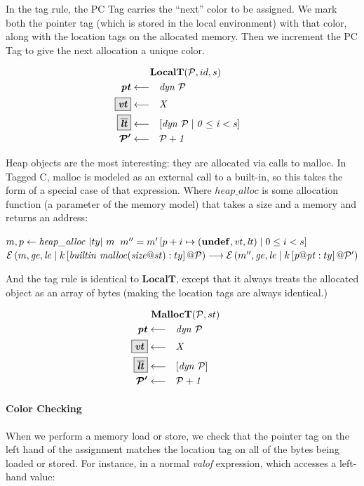 \documentclass{article}
\begin{document}
In the tag rule, the PC Tag carries the ``next'' color to be assigned. We mark both the pointer tag
(which is stored in the local environment) with that color, along with the location tags on the
allocated memory. Then we increment the PC Tag to give the next allocation a unique color.

\[\begin{aligned}
\truledef{\localt{\PCT}{id}{s}}
\settag{\pt}{dyn ~ \PCT}
\settagopt{\vt}{X}
\settagopt{\overline{\lt}}{\left[dyn ~ \PCT \mid 0 \leq i < s\right]}
\settag{\PCT'}{\PCT+1}
\end{aligned}\]
         
Heap objects are the most interesting: they are allocated via calls to malloc.
In Tagged C, malloc is modeled as an external call to a built-in, so this takes the form
of a special case of that expression. Where \(\mathit{heap\_alloc}\) is some allocation
function (a parameter of the memory model) that takes a size and a memory and returns an address:

              {\(\mem,p \leftarrow \mathit{heap\_alloc} ~ |ty| ~ \mem\)}
              {\(\mem'' = \mem'\left[p + i \mapsto (\vundef,\vt,\lt) \mid 0 \leq i < s\right]\)}
              {\(\defestate{\builtin{\mathit{malloc}}{\mathit{size}@st}}{ty}
                \longrightarrow
                \estate{\PCT'}{\mem''}{\genv}{\lenv}
                       {\val{p}{\pt}}{ty}{\cont}\)}

And the tag rule is identical to \(\mathbf{LocalT}\), except that it always treats the allocated
object as an array of bytes (making the location tags are always identical.)

\[\begin{aligned}
\truledef{\malloct{\PCT}{st}}
\settag{\pt}{dyn ~ \PCT}
\settagopt{\vt}{X}
\settagopt{\overline{\lt}}{\left[dyn ~ \PCT\right]}
\settag{\PCT'}{\PCT + 1}
\end{aligned}\]

\paragraph*{Color Checking}

When we perform a memory load or store, we check that the pointer tag on the left hand
of the assignment matches the location tag on all of the bytes being loaded or stored.
For instance, in a normal {\it valof} expression, which accesses a left-hand value:
\end{document}
